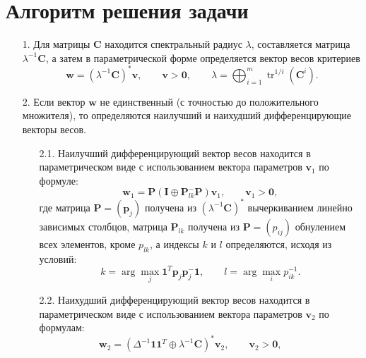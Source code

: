 \documentclass[specialist, substylefile = spbureport.rtx,
    subf,href,colorlinks=true, 12pt]{disser}
\begin{document}
    \section{Алгоритм решения задачи}
    \begin{itemize}
        \item[1.]
        Для матрицы $\bm{C}$ находится спектральный радиус $\lambda$, составляется матрица $\lambda^{-1}\bm{C}$, а затем в параметрической форме определяется вектор весов критериев
        \begin{equation}
        \bm{w}
        =
        (\lambda^{-1}\bm{C})^{\ast}\bm{v},
        \qquad
        \bm{v}>\bm{0},
        \qquad
        \lambda
        =
        \bigoplus_{i=1}^{m}{\mathop\mathrm{tr}}^{1/i}(\bm{C}^{i}).
        \end{equation}
        \item[2.]
        Если вектор $\bm{w}$ не единственный (с точностью до положительного множителя), то определяются наилучший и наихудший дифференцирующие векторы весов.
        \begin{itemize}
        \item[2.1.]
        Наилучший дифференцирующий вектор весов находится в параметрическом виде с использованием вектора параметров $\bm{v}_{1}$ по формуле:
        \begin{equation}
        \bm{w}_{1}
        =
        \bm{P}(\bm{I}\oplus\bm{P}_{lk}^{-}\bm{P})\bm{v}_{1},
        \qquad
        \bm{v}_{1}
        >
        \bm{0},
        \end{equation}
        где матрица $\bm{P}=(\bm{p}_{j})$ получена из $(\lambda^{-1}\bm{C})^{\ast}$ вычеркиванием линейно зависимых столбцов, матрица $\bm{P}_{lk}$ получена из $\bm{P}=(p_{ij})$ обнулением всех элементов, кроме $p_{lk}$, а индексы $k$ и $l$ определяются, исходя из условий:
        \begin{equation}
        k
        =
        \arg\max_{j}\bm{1}^{T}\bm{p}_{j}\bm{p}_{j}^{-}\bm{1},
        \qquad
        l
        =
        \arg\max_{i}p_{ik}^{-1}.
        \end{equation}
        \item[2.2.]
        Наихудший дифференцирующий вектор весов находится в параметрическом виде с использованием вектора параметров $\bm{v}_{2}$ по формулам:
        \begin{equation}
        \bm{w}_{2}
        =
        (\Delta^{-1}\bm{1}\bm{1}^{T}\oplus\lambda^{-1}\bm{C})^{\ast}\bm{v}_{2},
        \qquad
        \bm{v}_{2}
        >
        \bm{0},
        \qquad

\end{equation}
\end{itemize}
\end{itemize}
\end{document}
